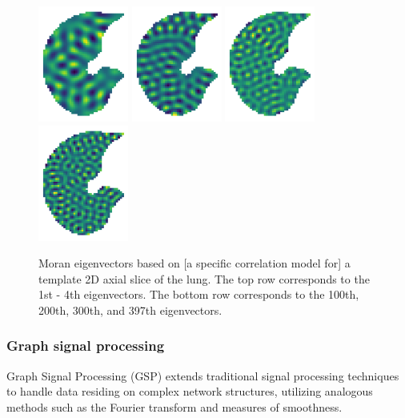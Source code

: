 \documentclass[12pt]{article}
\begin{document}
\begin{figure}
	\includegraphics[height=1.5in]{EV100}
	\includegraphics[height=1.5in]{EV200}
	\includegraphics[height=1.5in]{EV300}
	\includegraphics[height=1.5in]{EV397}
	\caption{Moran eigenvectors based on [a specific correlation model for] a template 2D axial slice of the lung. The top row corresponds to the 1st - 4th eigenvectors. The bottom row corresponds to the 100th, 200th, 300th, and 397th eigenvectors. }
	\label{fig:eigenvectors}
\end{figure}

\subsubsection{Graph signal processing}

Graph Signal Processing (GSP) extends traditional signal processing techniques to handle data residing on complex network structures, utilizing analogous methods such as the Fourier transform and measures of smoothness.
\end{document}

